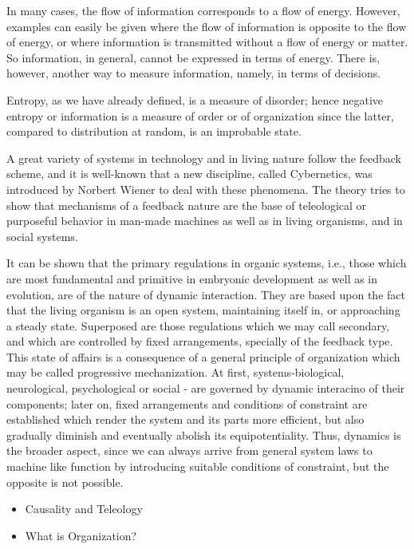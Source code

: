 \documentclass[
]{book}
\begin{document}
In many cases, the flow of information corresponds to a flow of energy. However, examples can easily be given where the flow of information is opposite to the flow of energy, or where information is transmitted without a flow of energy or matter. So information, in general, cannot be expressed in terms of energy. There is, however, another way to measure information, namely, in terms of decisions.

Entropy, as we have already defined, is a measure of disorder; hence negative entropy or information is a measure of order or of organization since the latter, compared to distribution at random, is an improbable state.

A great variety of systems in technology and in living nature follow the feedback scheme, and it is well-known that a new discipline, called Cybernetics, was introduced by Norbert Wiener to deal with these phenomena. The theory tries to show that mechanisms of a feedback nature are the base of teleological or purposeful behavior in man-made machines as well as in living organisms, and in social systems.

It can be shown that the primary regulations in organic systems, i.e., those which are most fundamental and primitive in embryonic development as well as in evolution, are of the nature of dynamic interaction. They are based upon the fact that the living organism is an open system, maintaining itself in, or approaching a steady state. Superposed are those regulations which we may call secondary, and which are controlled by fixed arrangements, specially of the feedback type. This state of affairs is a consequence of a general principle of organization which may be called progressive mechanization. At first, systems-biological, neurological, psychological or social - are governed by dynamic interacino of their components; later on, fixed arrangements and conditions of constraint are established which render the system and its parts more efficient, but also gradually diminish and eventually abolish its equipotentiality. Thus, dynamics is the broader aspect, since we can always arrive from general system laws to machine like function by introducing suitable conditions of constraint, but the opposite is not possible.

\begin{itemize}
\item
  Causality and Teleology
\item
  What is Organization?
\end{itemize}
\end{document}
